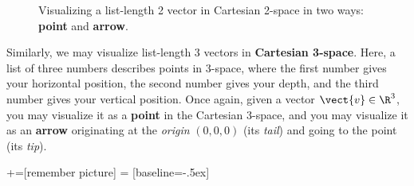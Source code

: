 \begin{figure}[H]

\caption{Visualizing a list-length 2 vector in Cartesian 2-space in two ways:   \textbf{point} and  \textbf{arrow}.}
\label{figure:visualizing1}
\end{figure}

Similarly, we may visualize list-length 3 vectors in \textbf{Cartesian 3-space}.  
Here, a list of three numbers describes points in 3-space, where the first number gives your horizontal position, the second number gives your depth, and the third number gives your vertical position.
Once again, given a vector $\vect{v}\in\R^3$, you may visualize it as a \textbf{point} in the Cartesian 3-space, and you may visualize it as an \textbf{arrow} originating at the \textit{origin} $(0,0,0)$ (its \textit{tail}) and going to the point (its \textit{tip}).

+=[remember picture]
 = [baseline=-.5ex]

